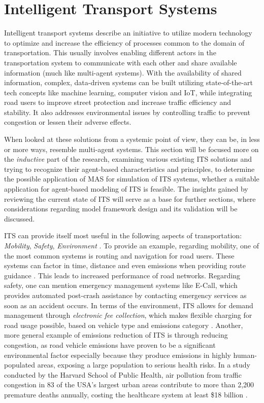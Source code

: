 \documentclass[main.tex]{subfiles}
\begin{document}
\section{Intelligent Transport Systems}\label{sec-its}

Intelligent transport systems describe an initiative to utilize modern technology 
to optimize and increase the efficiency of processes common to the domain of transportation. 
This usually involves enabling different actors in the transportation system to communicate 
with each other and share available information (much like multi-agent systems). With the 
availability of shared information, complex, data-driven systems can be built utilizing 
state-of-the-art tech concepts like machine learning, computer vision and IoT, while
integrating road users to improve street protection and increase traffic efficiency and stability.
It also addresses environmental issues by controlling traffic to prevent congestion or lessen
their adverse effects. 

When looked at these solutions from a systemic point of view, they can 
be, in less or more ways, resemble multi-agent systems. This section will be focused more on 
the \emph{inductive} part of the research, examining various existing ITS solutions and trying 
to recognize their agent-based characteristics and principles, to determine the possible application 
of MAS for simulation of ITS systems, whether a suitable application for agent-based modeling of 
ITS is feasible. The insights gained by reviewing the current state of ITS will 
serve as a base for further sections, where considerations regarding model framework design and 
its validation will be discussed. 

ITS can provide itself most useful in the following aspects of transportation: 
\emph{Mobility}, \emph{Safety}, \emph{Environment} \cite{Lishchenko2021}. To provide an example, regarding mobility, 
one of the most common systems is routing and navigation for road users. These systems can 
factor in time, distance and even emissions when providing route guidance \cite{Firmin2006}. This leads to 
increased performance of road networks. Regarding safety, one can mention emergency management
systems like E-Call, which provides automated post-crash assistance by contacting emergency
services as soon as an accident occurs. In terms of the environment, 
ITS allows for demand management through \emph{electronic fee collection}, which makes flexible 
charging for road usage possible, based on vehicle type and emissions category \cite{Commision2022}.
Another, more general example of emissions reduction of ITS is through reducing congestion, as road vehicle 
emissions have proven to be a significant environmental factor especially because they produce emissions 
in highly human-populated areas, exposing a large population to serious health risks. In a study conducted by the Harvard
School of Public Health, air pollution from traffic congestion in 83 of the USA's largest urban
areas contribute to more than 2,200 premature deaths annually, costing the healthcare system at
least \$18 billion \cite{Levy2011}.
\end{document}

